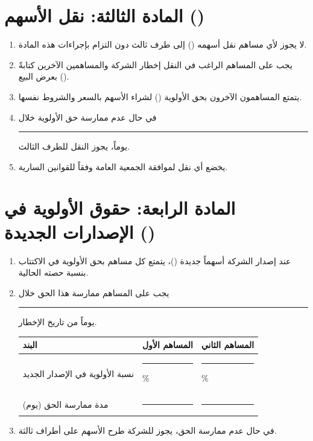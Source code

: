 \documentclass[12pt,a4paper]{article}
\begin{document}
\section{المادة الثالثة: نقل الأسهم ()}
\label{sec:transfer}
\begin{enumerate}
    \item لا يجوز لأي مساهم نقل أسهمه () إلى طرف ثالث دون التزام بإجراءات هذه المادة.
    \item يجب على المساهم الراغب في النقل إخطار الشركة والمساهمين الآخرين كتابةً بعرض البيع ().
    \item يتمتع المساهمون الآخرون بحق الأولوية () لشراء الأسهم بالسعر والشروط نفسها.
    \item في حال عدم ممارسة حق الأولوية خلال \rule{2cm}{0.4pt} يوماً، يجوز النقل للطرف الثالث.
    \item يخضع أي نقل لموافقة الجمعية العامة وفقاً للقوانين السارية.
\end{enumerate}

\section{المادة الرابعة: حقوق الأولوية في الإصدارات الجديدة ()}
\label{sec:preemptive}
\begin{enumerate}
    \item عند إصدار الشركة أسهماً جديدة ()، يتمتع كل مساهم بحق الأولوية في الاكتتاب بنسبة حصته الحالية.
    \item يجب على المساهم ممارسة هذا الحق خلال \rule{2cm}{0.4pt} يوماً من تاريخ الإخطار.

\begin{table}[H]
\centering
\renewcommand{\arraystretch}{1.5}
\begin{tabularx}{\textwidth}{L{6cm} C{3cm} C{3cm}}
\toprule
\textbf{البند} & \textbf{المساهم الأول} & \textbf{المساهم الثاني} \\
\midrule
نسبة الأولوية في الإصدار الجديد & \rule{2cm}{0.4pt}\% & \rule{2cm}{0.4pt}\% \\
مدة ممارسة الحق (يوم) & \rule{2cm}{0.4pt} & \rule{2cm}{0.4pt} \\
\bottomrule
\end{tabularx}
\end{table}

    \item في حال عدم ممارسة الحق، يجوز للشركة طرح الأسهم على أطراف ثالثة.
\end{enumerate}
\end{document}
